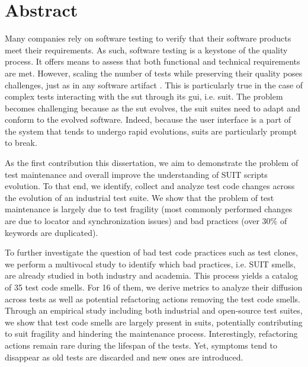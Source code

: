 \chapter*{Abstract}

Many companies rely on software testing to verify that their software products meet their requirements. As such, software testing is a keystone of the quality process. It offers means to assess that both functional and technical requirements are met. However, scaling the number of tests while preserving their quality poses challenges, just as in any software artifact . This is particularly true in the case of complex tests interacting with the \gls{sut} through its \gls{gui}, i.e. \gls{suit}. The problem becomes challenging because as the \gls{sut} evolves, the \gls{suit} suites need to adapt and conform to the evolved software. Indeed, because the user interface is a part of the system that tends to undergo rapid evolutions, \gls{suit}s are particularly prompt to break.

As the first contribution this dissertation, we aim to demonstrate the problem of test maintenance and overall improve the understanding of SUIT scripts evolution. To that end, we identify, collect and analyze test code changes across the evolution of an industrial test suite. We show that the problem of test maintenance is largely due to test fragility (most commonly performed changes are due to locator and synchronization issues) and bad practices (over 30\% of keywords are duplicated). 

To further investigate the question of bad test code practices such as test clones, we perform a multivocal study to identify which bad practices, i.e. SUIT smells, are already studied in both industry and academia. This process yields a catalog of 35 test code smells. For 16 of them, we derive metrics to analyze their diffusion across tests as well as potential refactoring actions removing the test code smells. Through an empirical study including both industrial and open-source test suites, we show that test code smells are largely present in \gls{suit}s, potentially contributing to \gls{suit} fragility and hindering the maintenance process. Interestingly, refactoring actions remain rare during the lifespan of the tests. Yet, symptoms tend to disappear as old tests are discarded and new ones are introduced.

